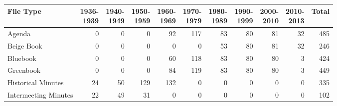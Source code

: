 \begin{tabular}{lrrrrrrrrrr}
\toprule
                  File Type & \shortstack{1936-\\1939} & \shortstack{1940-\\1949} & \shortstack{1950-\\1959} & \shortstack{1960-\\1969} & \shortstack{1970-\\1979} & \shortstack{1980-\\1989} & \shortstack{1990-\\1999} & \shortstack{2000-\\2010} & \shortstack{2010-\\2013} & Total \\
\midrule
                     Agenda &                        0 &                        0 &                        0 &                       92 &                      117 &                       83 &                       80 &                       81 &                       32 &   485 \\
                 Beige Book &                        0 &                        0 &                        0 &                        0 &                        0 &                       53 &                       80 &                       81 &                       32 &   246 \\
                   Bluebook &                        0 &                        0 &                        0 &                       60 &                      118 &                       83 &                       80 &                       80 &                        3 &   424 \\
                  Greenbook &                        0 &                        0 &                        0 &                       84 &                      119 &                       83 &                       80 &                       80 &                        3 &   449 \\
         Historical Minutes &                       24 &                       50 &                      129 &                      132 &                        0 &                        0 &                        0 &                        0 &                        0 &   335 \\
       Intermeeting Minutes &                       22 &                       49 &                       31 &                        0 &                        0 &                        0 &                        0 &                        0 &                        0 &   102 \\

\end{tabular}
